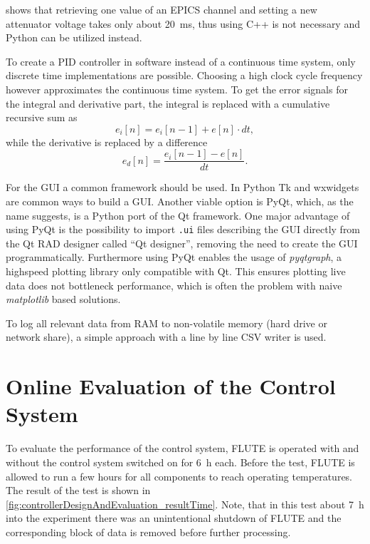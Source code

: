  shows that retrieving one value of an EPICS channel and setting a new attenuator voltage takes only about \SI{20}{\milli\second}, thus using C++ is not necessary and Python can be utilized instead.
 
To create a PID controller in software instead of a continuous time system, only discrete time implementations are possible. Choosing a high clock cycle frequency however approximates the continuous time system. To get the error signals for the integral and derivative part, the integral is replaced with a cumulative recursive sum as
\begin{equation}
e_i[n]=e_i[n-1]+e[n] \cdot dt,
\end{equation}
while the derivative is replaced by a difference
\begin{equation}
e_d[n]=\frac{e_i[n-1]-e[n]}{dt}.
\end{equation}

For the GUI a common framework should be used. In Python Tk and wxwidgets are common ways to build a GUI. Another viable option is PyQt, which, as the name suggests, is a Python port of the Qt framework. One major advantage of using PyQt is the possibility to import \texttt{.ui} files describing the GUI directly from the Qt RAD designer called ``Qt designer'', removing the need to create the GUI programmatically. Furthermore using PyQt enables the usage of \textit{pyqtgraph}, a highspeed plotting library only compatible with Qt. This ensures plotting live data does not bottleneck performance, which is often the problem with naive \textit{matplotlib} based solutions.

To log all relevant data from RAM to non-volatile memory (hard drive or network share), a simple approach with a line by line CSV writer is used.









\newpage
\section{Online Evaluation of the Control System}
To evaluate the performance of the control system, FLUTE is operated with and without the control system switched on for \SI{6}{\hour} each.
Before the test, FLUTE is allowed to run a few hours for all components to reach operating temperatures.
The result of the test is shown in \autoref{fig:controllerDesignAndEvaluation_resultTime}.
Note, that in this test about \SI{7}{\hour} into the experiment there was an unintentional shutdown of FLUTE and the corresponding block of data is removed before further processing.

